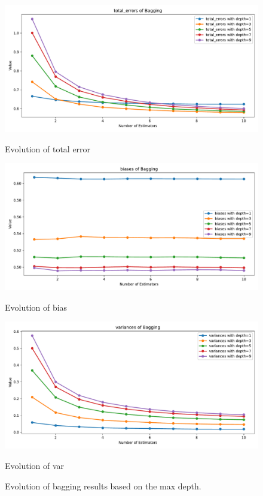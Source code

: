 \documentclass[a4paper,10pt]{article}
\begin{document}
\begin{figure}[H]
    \centering 
    \begin{minipage}{0.33\textwidth}
        \centering
        \includegraphics[width=\linewidth]{images/2.5_total_error_bagging.pdf}
        \caption{Evolution of total error}
    \end{minipage}%
    \begin{minipage}{0.33\textwidth}
        \centering
        \includegraphics[width=\linewidth]{images/2.5_bias_bagging.pdf}
        \caption{Evolution of bias}
    \end{minipage}%
    \begin{minipage}{0.33\textwidth}
        \centering
        \includegraphics[width=\linewidth]{images/2.5_var_bagging.pdf}
        \caption{Evolution of var}
    \end{minipage}
    \caption{Evolution of bagging results based on the max depth.}
\end{figure}
\end{document}
